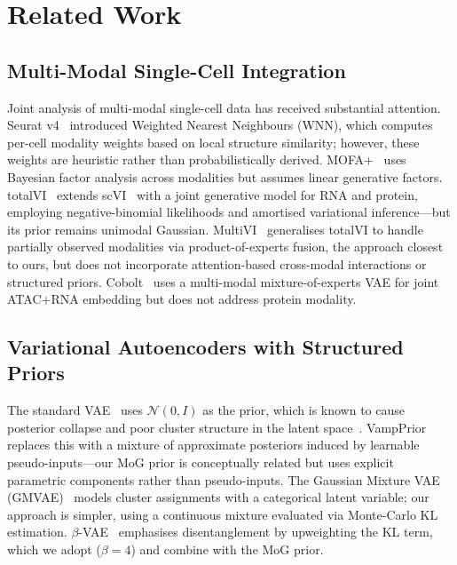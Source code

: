 \documentclass[11pt,a4paper]{article}
\begin{document}
\section{Related Work}\label{sec:related}

\subsection{Multi-Modal Single-Cell Integration}

Joint analysis of multi-modal single-cell data has received substantial attention.
Seurat v4~\citep{hao2021} introduced Weighted Nearest Neighbours (WNN), which computes per-cell modality weights based on local structure similarity; however, these weights are heuristic rather than probabilistically derived.
MOFA+~\citep{argelaguet2020} uses Bayesian factor analysis across modalities but assumes linear generative factors.
totalVI~\citep{gayoso2021} extends scVI~\citep{lopez2018} with a joint generative model for RNA and protein, employing negative-binomial likelihoods and amortised variational inference—but its prior remains unimodal Gaussian.
MultiVI~\citep{ashuach2023} generalises totalVI to handle partially observed modalities via product-of-experts fusion, the approach closest to ours, but does not incorporate attention-based cross-modal interactions or structured priors.
Cobolt~\citep{gong2021} uses a multi-modal mixture-of-experts VAE for joint ATAC+RNA embedding but does not address protein modality.

\subsection{Variational Autoencoders with Structured Priors}

The standard VAE~\citep{kingma2014} uses $\mathcal{N}(0,I)$ as the prior, which is known to cause posterior collapse and poor cluster structure in the latent space~\citep{bowman2016}.
VampPrior~\citep{tomczak2018} replaces this with a mixture of approximate posteriors induced by learnable pseudo-inputs—our MoG prior is conceptually related but uses explicit parametric components rather than pseudo-inputs.
The Gaussian Mixture VAE (GMVAE)~\citep{dilokthanakul2016} models cluster assignments with a categorical latent variable; our approach is simpler, using a continuous mixture evaluated via Monte-Carlo KL estimation.
$\beta$-VAE~\citep{higgins2017} emphasises disentanglement by upweighting the KL term, which we adopt ($\beta=4$) and combine with the MoG prior.
\end{document}
